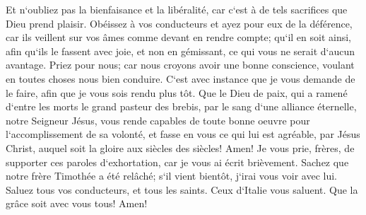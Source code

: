 \verse Et n`oubliez pas la bienfaisance et la libéralité, car c`est à de tels sacrifices que Dieu prend plaisir. 
\verse Obéissez à vos conducteurs et ayez pour eux de la déférence, car ils veillent sur vos âmes comme devant en rendre compte; qu`il en soit ainsi, afin qu`ils le fassent avec joie, et non en gémissant, ce qui vous ne serait d`aucun avantage. 
\verse Priez pour nous; car nous croyons avoir une bonne conscience, voulant en toutes choses nous bien conduire. 
\verse C`est avec instance que je vous demande de le faire, afin que je vous sois rendu plus tôt. 
\verse Que le Dieu de paix, qui a ramené d`entre les morts le grand pasteur des brebis, par le sang d`une alliance éternelle, notre Seigneur Jésus, 
\verse vous rende capables de toute bonne oeuvre pour l`accomplissement de sa volonté, et fasse en vous ce qui lui est agréable, par Jésus Christ, auquel soit la gloire aux siècles des siècles! Amen! 
\verse Je vous prie, frères, de supporter ces paroles d`exhortation, car je vous ai écrit brièvement. 
\verse Sachez que notre frère Timothée a été relâché; s`il vient bientôt, j`irai vous voir avec lui. 
\verse Saluez tous vos conducteurs, et tous les saints. Ceux d`Italie vous saluent. 
\verse Que la grâce soit avec vous tous! Amen! 
